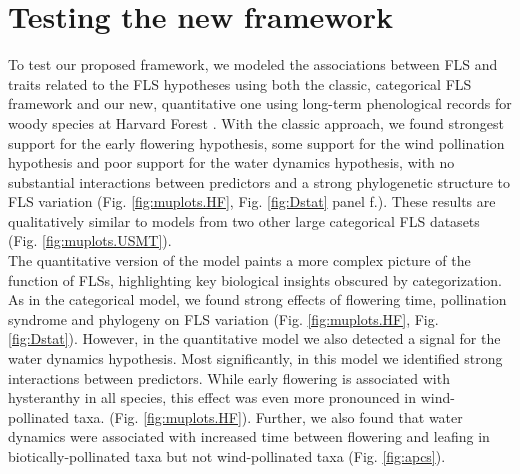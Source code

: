 \documentclass{article}
\begin{document}


\section*{Testing the new framework}

To test our proposed framework, we modeled the associations between FLS and traits related to the FLS hypotheses using both the classic, categorical FLS framework and our new, quantitative one using long-term phenological records for woody species at Harvard Forest \citep{OKeefe2015}. With the classic approach, we found strongest support for the early flowering hypothesis, some support for the wind pollination hypothesis and poor support for the water dynamics hypothesis, with no substantial interactions between predictors and a strong phylogenetic structure to FLS variation (Fig. \ref{fig:muplots.HF}, Fig.  \ref{fig:Dstat} panel f.). These results are qualitatively similar to models from two other large categorical FLS datasets (Fig. \ref{fig:muplots.USMT}). \\

\noindent The quantitative version of the model paints a more complex picture of the function of FLSs, highlighting key biological insights obscured by categorization. As in the categorical model, we found strong effects of flowering time, pollination syndrome and phylogeny on FLS variation (Fig. \ref{fig:muplots.HF}, Fig. \ref{fig:Dstat}). However, in the quantitative model we also detected a signal for the water dynamics hypothesis. %
Most significantly, in this model we identified strong interactions between predictors. While early flowering is associated with hysteranthy in all species, this effect was even more pronounced in wind-pollinated taxa. (Fig. \ref{fig:muplots.HF}). Further, we also found that water dynamics were associated with increased time between flowering and leafing in biotically-pollinated taxa but not wind-pollinated taxa (Fig. \ref{fig:apcs}). \\ 
\end{document}
